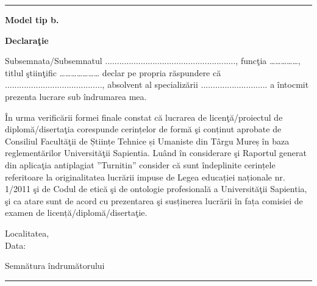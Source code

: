 \documentclass[a4paper, 11pt]{article}
\begin{document}
\begin{titlepage}
\hyphenchar{}
\sloppy

\noindent \rule[10pt]{\textwidth}{1pt}
\begin{flushright}
{\fontsize{12pt}{1} \textbf{Model tip b.}}
\end{flushright}

\vspace{7em}
\begin{center}
{\fontsize{12pt}{1} \textbf{Declaraţie}}\\
\end{center}

\vspace{4em}
\doublespacing

\large Subsemnata/Subsemnatul ......................................................., funcţia ……………, titlul ştiinţific ………………… declar pe propria răspundere că ........................................., absolvent al specializării ............................ a întocmit prezenta lucrare sub îndrumarea mea.
\par În urma verificării formei finale constat că lucrarea de licenţă/proiectul de diplomă/disertaţia corespunde cerințelor de formă şi conținut aprobate de Consiliul Facultăţii de Științe Tehnice și Umaniste din Târgu Mureș în baza reglementărilor Universităţii Sapientia. Luând în considerare şi Raportul generat din aplicaţia antiplagiat ''Turnitin'' consider că sunt îndeplinite cerințele referitoare la originalitatea lucrării impuse de Legea educației naționale nr. 1/2011 şi de Codul de etică şi de ontologie profesională a Universităţii Sapientia, şi ca atare sunt de acord cu prezentarea şi susținerea lucrării în fața comisiei de examen de licență/diplomă/disertaţie.

\vspace{5em}
\begin{flushleft}
{\large Localitatea,\\
Data:}
\end{flushleft}

\begin{flushright}
{\large Semnătura îndrumătorului}
\end{flushright}

\end{titlepage}

\begin{titlepage}
\noindent \rule[10pt]{\textwidth}{1pt}
\end{titlepage}
\end{document}
